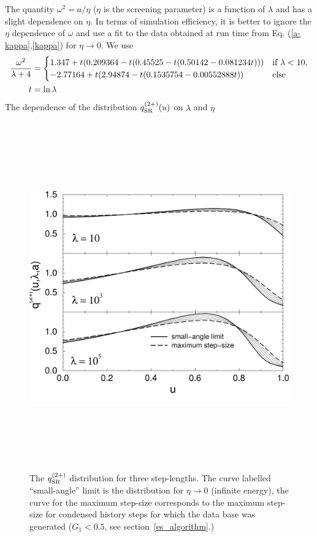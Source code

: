 The quantity $\omega^2 = a/\eta$ ($\eta$ is the screening parameter)
is a function of $\lambda$ and has a slight dependence
on $\eta$. In terms of simulation efficiency, it is better to
ignore the $\eta$ dependence of $\omega$ and use a fit to
the data obtained  at run time from Eq. (\ref{a-kappa},\ref{kappa}) for
$\eta \to 0$. We use
\begin{equation}
\label{fit_omega2}
\begin{split}
{\omega^2 \over \lambda + 4} & =
\begin{cases}
1.347 + t (0.209364 - t (0.45525 - t (0.50142 - 0.081234 t))) & \text{if}~
\lambda < 10, \\
-2.77164 + t (2.94874 - t (0.1535754 - 0.00552888 t)) & \text{else}
\end{cases}
\\
t & = \ln \lambda
\end{split}
\end{equation}
The dependence of the distribution $q^{(2+)}_{\rm SR}(u)$ on
$\lambda$ and $\eta$
\begin{figure}[htp]
\includegraphics[height=15cm,width=15cm]{figures/q2}
\caption[The $q^{(2+)}$ surface]{\label{fig_q2}
The $q^{(2+)}_{\rm SR}$ distribution for
three step-lengths. The curve labelled ``small-angle'' limit is
the distribution for $\eta \to 0$ (infinite energy), the
curve for the maximum step-size corresponds to the
maximum step-size for condensed history steps for which the data base was
generated ($G_1 < 0.5$, see section~\ref{es_algorithm}.)}
\end{figure}
